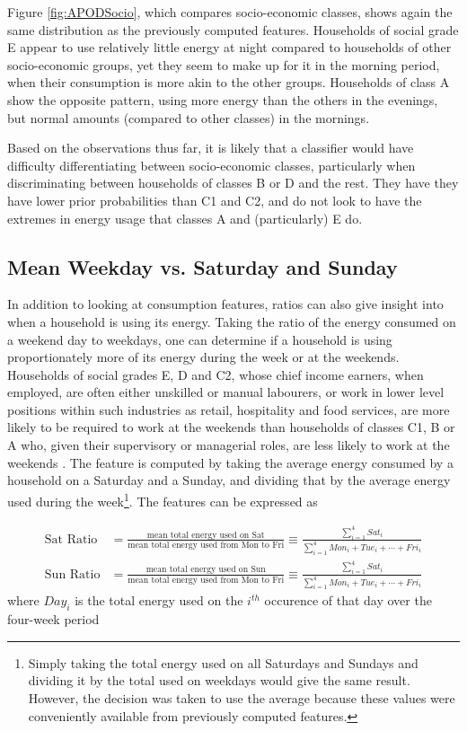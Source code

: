 \APODSocio %

Figure \ref{fig:APODSocio}, which compares socio-economic classes, shows again the same distribution as the previously computed features. Households of social grade E appear to use relatively little energy at night compared to households of other socio-economic groups, yet they seem to make up for it in the morning period, when their consumption is more akin to the other groups. Households of class A show the opposite pattern, using more energy than the others in the evenings, but normal amounts (compared to other classes) in the mornings.

Based on the observations thus far, it is likely that a classifier would have difficulty differentiating between socio-economic classes, particularly when discriminating between households of classes B or D and the rest. They have they have lower prior probabilities than C1 and C2, and do not look to have the extremes in energy usage that classes A and (particularly) E do. 


\subsection*{Mean Weekday vs. Saturday and Sunday}
In addition to looking at consumption features, ratios can also give insight into when a household is using its energy. Taking the ratio of the energy consumed on a weekend day to weekdays, one can determine if a household is using proportionately more of its energy during the week or at the weekends. Households of social grades E, D and C2, whose chief income earners, when employed, are often either unskilled or manual labourers, or work in lower level positions within such industries as retail, hospitality and food services, are more likely to be required to work at the weekends than households of classes C1, B or A who, given their supervisory or managerial roles, are less likely to work at the weekends \cite{careers}. The feature is computed by taking the average energy consumed by a household on a Saturday and a Sunday, and dividing that by the average energy used during the week\footnote{Simply taking the total energy used on all Saturdays and Sundays and dividing it by the total used on weekdays would give the same result. However, the decision was taken to use the average because these values were conveniently available from previously computed features.}. The features can be expressed as

\begin{align*}
\text{Sat Ratio}&=\frac{\text{mean total energy used on Sat}}{\text{mean total energy used from Mon to Fri}}\equiv\frac{\sum_{i=1}^4Sat_i}{\sum_{i=1}^4{Mon_i + Tue_i+\cdots+ Fri_i}} \\
\text{Sun Ratio}&=\frac{\text{mean total energy used on Sun}}{\text{mean total energy used from Mon to Fri}}\equiv\frac{\sum_{i=1}^4Sat_i}{\sum_{i=1}^4{Mon_i + Tue_i+\cdots+ Fri_i}} 
\end{align*}
where $Day_i$ is the total energy used on the $i^{th}$ occurence of that day over the four-week period
\POWrat

